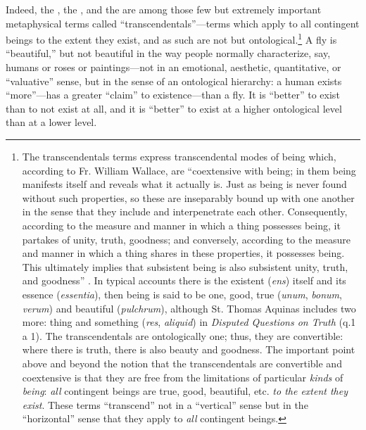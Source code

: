 Indeed, the , the , and the  are among those few but extremely important metaphysical terms called ``transcendentals''---terms which apply to all contingent beings to the extent they exist, and as such are not  but ontological.\footnote{The transcendentals terms express transcendental modes of being which, according to Fr. William Wallace, are ``coextensive with being; in them being manifests itself and reveals what it actually is. Just as being is never found without such properties, so these are inseparably bound up with one another in the sense that they include and interpenetrate each other. Consequently, according to the measure and manner in which a thing possesses being, it partakes of unity, truth, goodness; and conversely, according to the measure and manner in which a thing shares in these properties, it possesses being. This ultimately implies that subsistent being is also subsistent unity, truth, and goodness'' \citep[][p. 85]{ephil}.  In typical accounts there is the existent (\textit{ens}) itself and its essence (\textit{essentia}), then being is said to be one, good, true (\textit{unum}, \textit{bonum}, \textit{verum}) and beautiful (\textit{pulchrum}), although St. Thomas Aquinas includes two more: thing and something (\textit{res}, \textit{aliquid}) in \textit{Disputed Questions on Truth} (q.1 a 1). The transcendentals are ontologically one; thus, they are convertible: where there is truth, there is also beauty and goodness. The important point above and beyond the notion that the transcendentals are convertible and coextensive is that they are free from the limitations of particular \textit{kinds} of \textit{being}: \textit{all} contingent beings are true, good, beautiful, etc. \textit{to the extent they exist}. These terms ``transcend'' not in a ``vertical'' sense but in the ``horizontal'' sense that they apply to \textit{all} contingent beings.} 
A fly is ``beautiful,'' but not beautiful in the way people normally characterize, say, humans or roses or paintings---not in an emotional, aesthetic, quantitative, or ``valuative'' sense, but in the sense of an ontological hierarchy: a human exists ``more''---has a greater ``claim'' to existence---than a fly. It is ``better'' to exist than to not exist at all, and it is ``better'' to exist at a higher ontological level than at a lower level.


